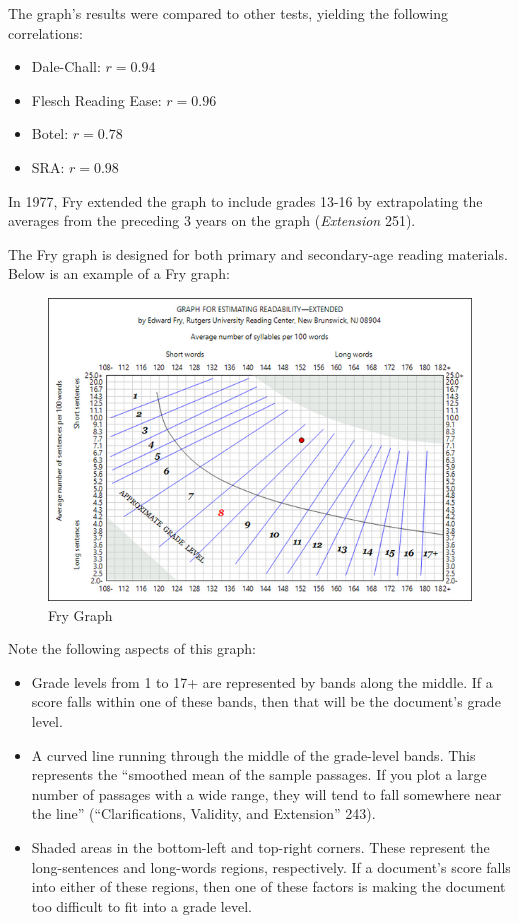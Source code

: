 \documentclass[
]{book}
\providecommand{\tightlist}{%
  \setlength{\itemsep}{0pt}\setlength{\parskip}{0pt}}
\theoremstyle{definition}
\theoremstyle{definition}
\theoremstyle{definition}
\theoremstyle{definition}
\theoremstyle{remark}
\begin{document}
The graph's results were compared to other tests, yielding the following correlations:

\begin{itemize}
\tightlist
\item
  Dale-Chall: \(r = 0.94\)
\item
  Flesch Reading Ease: \(r = 0.96\)
\item
  Botel: \(r = 0.78\)
\item
  SRA: \(r = 0.98\)
\end{itemize}

In 1977, Fry extended the graph to include grades 13-16 by extrapolating the averages from the preceding 3 years on the graph (\emph{Extension} 251).

The Fry graph is designed for both primary and secondary-age reading materials. Below is an example of a Fry graph:

\begin{figure}[H]

{\centering \includegraphics[width=0.75\linewidth,]{Images/frygraph} 

}

\caption{Fry Graph}\label{fig:fryGraph}
\end{figure}

\begin{minipage}{\textwidth}

Note the following aspects of this graph:

\begin{itemize}
\tightlist
\item
  Grade levels from 1 to 17+ are represented by bands along the middle. If a score falls within one of these bands, then that will be the document's grade level.
\item
  A curved line running through the middle of the grade-level bands. This represents the ``smoothed mean of the sample passages. If you plot a large number of passages with a wide range, they will tend to fall somewhere near the line'' (``Clarifications, Validity, and Extension'' 243).
\item
  Shaded areas in the bottom-left and top-right corners. These represent the long-sentences and long-words regions, respectively. If a document's score falls into either of these regions, then one of these factors is making the document too difficult to fit into a grade level.
\end{itemize}

\end{minipage}
\end{document}
